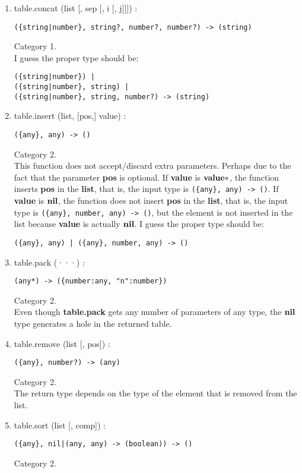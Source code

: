 \begin{enumerate}
\item table.concat (list [, sep [, i [, j]]]) :
\begin{verbatim}
({string|number}, string?, number?, number?) -> (string)
\end{verbatim}
Category 1.
\\
I guess the proper type should be:
\begin{verbatim}
({string|number}) |
({string|number}, string) |
({string|number}, string, number?) -> (string)
\end{verbatim}
\item table.insert (list, [pos,] value) :
\begin{verbatim}
({any}, any) -> ()
\end{verbatim}
Category 2.
\\
This function does not accept/discard extra parameters.
Perhaps due to the fact that the parameter \textbf{pos} is optional.
If \textbf{value} is $\mathbf{value}{*}$, the function inserts \textbf{pos}
in the \textbf{list}, that is, the input type is
\texttt{(\{any\}, any) -> ()}.
If \textbf{value} is $\mathbf{nil}$, the function does not insert \textbf{pos}
in the \textbf{list}, that is, the input type is
\texttt{(\{any\}, number, any) -> ()},
but the element is not inserted in the list because \textbf{value}
is actually $\mathbf{nil}$.
I guess the proper type should be:
\begin{verbatim}
({any}, any) | ({any}, number, any) -> ()
\end{verbatim}
\item table.pack (···) :
\begin{verbatim}
(any*) -> ({number:any, "n":number})
\end{verbatim}
Category 2.
\\
Even though \textbf{table.pack} gets any number of parameters of
any type, the $\mathbf{nil}$ type generates a hole in the returned table.
\item table.remove (list [, pos]) :
\begin{verbatim}
({any}, number?) -> (any)
\end{verbatim}
Category 2.
\\
The return type depends on the type of the element that is removed
from the list.
\item table.sort (list [, comp]) :
\begin{verbatim}
({any}, nil|(any, any) -> (boolean)) -> ()
\end{verbatim}
Category 2.
\\

\end{enumerate}
